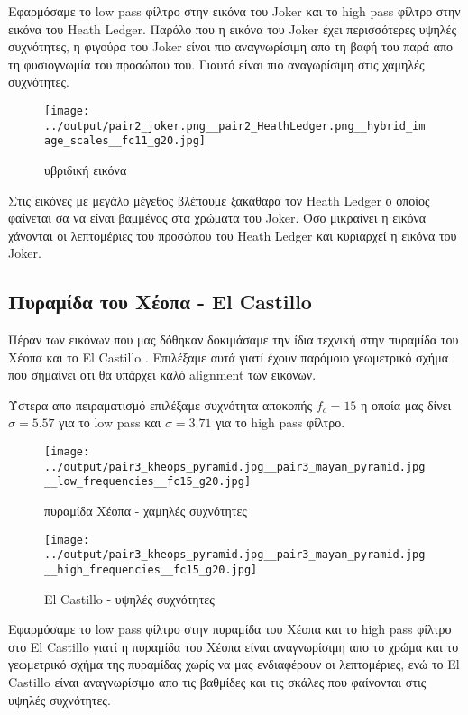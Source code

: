 \documentclass[11pt]{scrartcl} %
\begin{document}
Εφαρμόσαμε το low pass φίλτρο στην εικόνα του Joker και το high pass φίλτρο στην εικόνα του Heath Ledger. Παρόλο που η εικόνα του Joker έχει περισσότερες υψηλές συχνότητες, η φιγούρα του Joker είναι πιο αναγνωρίσιμη απο τη βαφή του παρά απο τη φυσιογνωμία του προσώπου του. Γιαυτό είναι πιο αναγωρίσιμη στις χαμηλές συχνότητες.

\begin{figure}[H]
  \texttt{[image: ../output/pair2\_joker.png\_\_pair2\_HeathLedger.png\_\_hybrid\_image\_scales\_\_fc11\_g20.jpg]}
  \caption{υβριδική εικόνα}
\end{figure}

Στις εικόνες με μεγάλο μέγεθος βλέπουμε ξακάθαρα τον Heath Ledger ο οποίος φαίνεται σα να είναι βαμμένος στα χρώματα του Joker. Όσο μικραίνει η εικόνα χάνονται οι λεπτομέριες του προσώπου του Heath Ledger και κυριαρχεί η εικόνα του Joker.

\subsection{Πυραμίδα του Χέοπα - El Castillo}

Πέραν των εικόνων που μας δόθηκαν δοκιμάσαμε την ίδια τεχνική στην πυραμίδα του Χέοπα \cite{wikipedia_kheops} και το El Castillo \cite{britannica_el_castillo}. Επιλέξαμε αυτά γιατί έχουν παρόμοιο γεωμετρικό σχήμα που σημαίνει οτι θα υπάρχει καλό alignment των εικόνων.

Ύστερα απο πειραματισμό επιλέξαμε συχνότητα αποκοπής $f_c = 15$ η οποία μας δίνει $\sigma = 5.57$ για το low pass και $\sigma = 3.71$ για το high pass φίλτρο.

\begin{figure}[H]
  \begin{minipage}[c]{9cm}
    \texttt{[image: ../output/pair3\_kheops\_pyramid.jpg\_\_pair3\_mayan\_pyramid.jpg\_\_low\_frequencies\_\_fc15\_g20.jpg]}
    \caption{πυραμίδα Χέοπα - χαμηλές συχνότητες}
  \end{minipage}
  \begin{minipage}[c]{9cm}
    \texttt{[image: ../output/pair3\_kheops\_pyramid.jpg\_\_pair3\_mayan\_pyramid.jpg\_\_high\_frequencies\_\_fc15\_g20.jpg]}
    \caption{El Castillo - υψηλές συχνότητες}
  \end{minipage}
\end{figure}

Εφαρμόσαμε το low pass φίλτρο στην πυραμίδα του Χέοπα και το high pass φίλτρο στο El Castillo γιατί η πυραμίδα του Χέοπα είναι αναγνωρίσιμη απο το χρώμα και το γεωμετρικό σχήμα της πυραμίδας χωρίς να μας ενδιαφέρουν οι λεπτομέριες, ενώ το El Castillo είναι αναγνωρίσιμο απο τις βαθμίδες και τις σκάλες που φαίνονται στις υψηλές συχνότητες.
\end{document}
